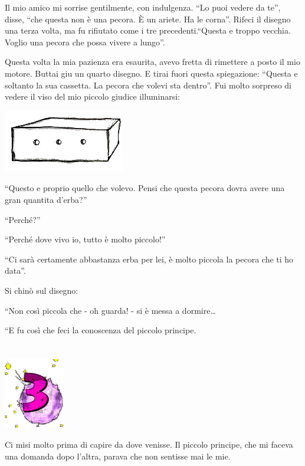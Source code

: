 \documentclass[11pt]{scrbook}
\begin{document}
Il mio amico mi sorrise gentilmente, con indulgenza. ``Lo puoi vedere da
te'', disse, ``che questa non è una pecora. È un ariete. Ha le corna''.
Rifeci il disegno una terza volta, ma fu rifiutato come i tre
precedenti.``Questa e troppo vecchia. Voglio una pecora che possa vivere
a lungo''.

Questa volta la mia pazienza era esaurita, avevo fretta di rimettere a
posto il mio motore. Buttai giu un quarto disegno. E tirai fuori questa
spiegazione: ``Questa e soltanto la sua cassetta. La pecora che volevi
sta dentro''. Fui molto sorpreso di vedere il viso del mio piccolo
giudice illuminarsi:

\begin{center}
\includegraphics{img/2e}
\end{center}

``Questo e proprio quello che volevo. Pensi che questa pecora dovra
avere una gran quantita d'erba?''

``Perché?''

``Perché dove vivo io, tutto è molto piccolo!''

``Ci sarà certamente abbastanza erba per lei, è molto piccola la pecora
che ti ho data''.

Si chinò sul disegno:

``Non così piccola che - oh guarda! - si è messa a dormire\ldots{}

``E fu così che feci la conoscenza del piccolo principe.

\chapter{}
\begin{center}
\includegraphics{img/chapter3}
\end{center}

Ci misi molto prima di capire da dove venisse. Il piccolo principe, che
mi faceva una domanda dopo l'altra, parava che non sentisse mai le mie.
\end{document}
